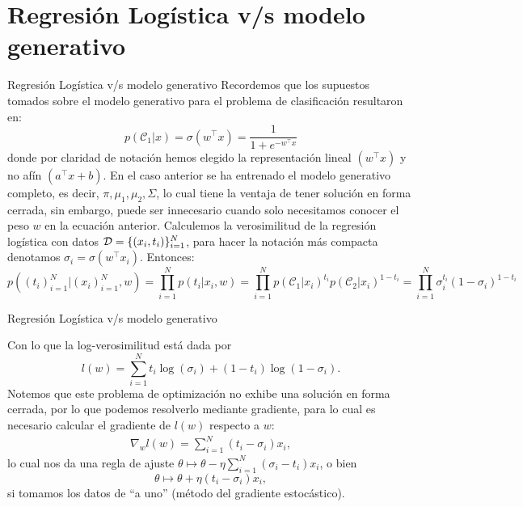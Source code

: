 \documentclass[9pt]{beamer}
\begin{document}
\section{Regresión Logística v/s modelo generativo}
\begin{frame}{Regresión Logística v/s modelo generativo}
Recordemos que los supuestos tomados sobre el modelo generativo para el problema de clasificación resultaron en:
\begin{equation*}
p(\mathcal{C}_1|x) = \sigma(w^\top x) = \frac{1}{1+e^{-w^\top x}}
\end{equation*}
donde por claridad de notación hemos elegido la representación lineal $(w^\top x)$ y no afín $(a^\top x + b)$. \pause
En el caso anterior se ha entrenado el modelo generativo completo, es decir, $\pi, \mu_1,\mu_2, \Sigma$, lo cual tiene la ventaja de tener solución en forma cerrada, sin embargo, puede ser innecesario cuando solo necesitamos conocer el peso $w$ en la ecuación anterior. \pause
Calculemos la verosimilitud de la regresión logística con datos ${\mathcal D}=\{(x_i,t_i)\}_{i=1}^N$, para hacer la notación más compacta denotamos $\sigma_i = \sigma(w^\top x_i)$. Entonces:
\begin{equation*}
p((t_i)_{i=1}^N|(x_i)_{i=1}^N,w) = \prod_{i=1}^{N}p(t_i|x_i,w)= \prod_{i=1}^{N} p(\mathcal{C}_1|x_i)^{t_i} p(\mathcal{C}_2|x_i)^{1-t_i} =  \prod_{i=1}^{N}\sigma_i^{t_i}(1-\sigma_i)^{1-t_i} 
\end{equation*}
\end{frame}
\begin{frame}{Regresión Logística v/s modelo generativo}

Con lo que la log-verosimilitud está dada por
\begin{equation*}
  l(w) = \sum_{i=1}^N t_i\log(\sigma_i) + (1-t_i)\log(1-\sigma_i).
\end{equation*} \pause 
Notemos que este  problema de optimización no exhibe una solución en forma cerrada, por lo que podemos resolverlo mediante gradiente, para lo cual es necesario calcular el gradiente de $l(w)$ respecto a $w$:
\begin{align*}
\nabla_w l(w) = \sum_{i=1}^N (t_i-\sigma_i)x_i,
\end{align*} \pause
lo cual nos da una regla de  ajuste $\theta \mapsto \theta - \eta \sum_{i=1}^N (\sigma_i-t_i)x_i$, o bien 
\begin{equation*}
  \theta \mapsto \theta + \eta(t_i-\sigma_i)x_i, \label{eq:reg_log_theta_update}
\end{equation*}
si tomamos los  datos de ``a uno'' (método del gradiente estocástico).


\end{frame}
\end{document}
